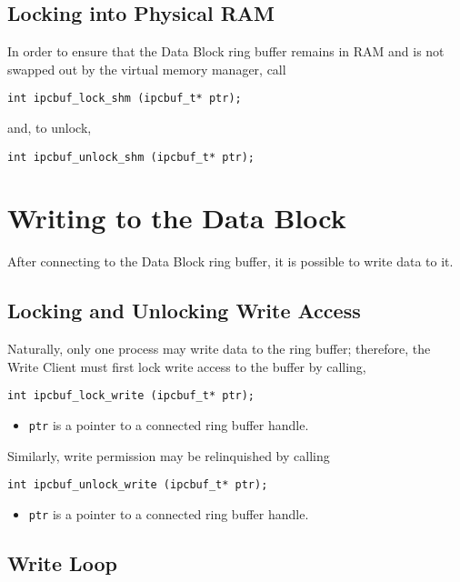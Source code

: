 \subsection{Locking into Physical RAM}

In order to ensure that the Data Block ring buffer remains in RAM and
is not swapped out by the virtual memory manager, call
\begin{verbatim}
int ipcbuf_lock_shm (ipcbuf_t* ptr);
\end{verbatim}
and, to unlock,
\begin{verbatim}
int ipcbuf_unlock_shm (ipcbuf_t* ptr);
\end{verbatim}


\section{Writing to the Data Block}

After connecting to the Data Block ring buffer, it is
possible to write data to it.

\subsection{Locking and Unlocking Write Access}

Naturally, only one process may write data to the ring buffer;
therefore, the Write Client must first lock write access to the buffer
by calling,
\begin{verbatim}
int ipcbuf_lock_write (ipcbuf_t* ptr);
\end{verbatim}
\vspace{-3mm}
\begin{itemize}
\item {\tt ptr} is a pointer to a connected ring buffer handle.
\end{itemize}
Similarly, write permission may be relinquished by calling
\begin{verbatim}
int ipcbuf_unlock_write (ipcbuf_t* ptr);
\end{verbatim}
\vspace{-3mm}
\begin{itemize}
\item {\tt ptr} is a pointer to a connected ring buffer handle.
\end{itemize}

\subsection{Write Loop}

